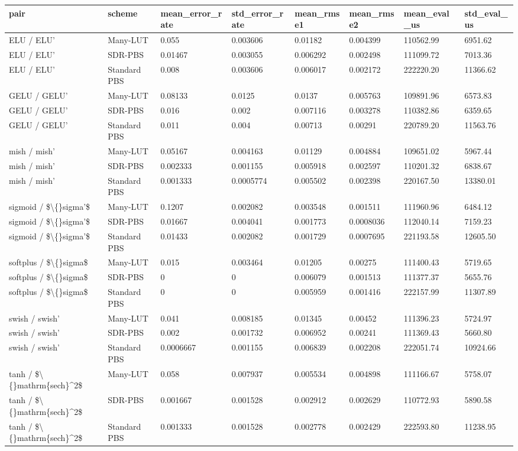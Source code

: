 \small
\setlength{\tabcolsep}{4pt}
\begin{tabular}{llllllll}
\toprule
pair & scheme & mean\_error\_rate & std\_error\_rate & mean\_rmse1 & mean\_rmse2 & mean\_eval\_us & std\_eval\_us \\
\midrule
ELU / ELU' & Many-LUT & 0.055 & 0.003606 & 0.01182 & 0.004399 & 110562.99 & 6951.62 \\
ELU / ELU' & SDR-PBS & 0.01467 & 0.003055 & 0.006292 & 0.002498 & 111099.72 & 7013.36 \\
ELU / ELU' & Standard PBS & 0.008 & 0.003606 & 0.006017 & 0.002172 & 222220.20 & 11366.62 \\
GELU / GELU' & Many-LUT & 0.08133 & 0.0125 & 0.0137 & 0.005763 & 109891.96 & 6573.83 \\
GELU / GELU' & SDR-PBS & 0.016 & 0.002 & 0.007116 & 0.003278 & 110382.86 & 6359.65 \\
GELU / GELU' & Standard PBS & 0.011 & 0.004 & 0.00713 & 0.00291 & 220789.20 & 11563.76 \\
mish / mish' & Many-LUT & 0.05167 & 0.004163 & 0.01129 & 0.004884 & 109651.02 & 5967.44 \\
mish / mish' & SDR-PBS & 0.002333 & 0.001155 & 0.005918 & 0.002597 & 110201.32 & 6838.67 \\
mish / mish' & Standard PBS & 0.001333 & 0.0005774 & 0.005502 & 0.002398 & 220167.50 & 13380.01 \\
sigmoid / \$\textbackslash\{\}sigma'\$ & Many-LUT & 0.1207 & 0.002082 & 0.003548 & 0.001511 & 111960.96 & 6484.12 \\
sigmoid / \$\textbackslash\{\}sigma'\$ & SDR-PBS & 0.01667 & 0.004041 & 0.001773 & 0.0008036 & 112040.14 & 7159.23 \\
sigmoid / \$\textbackslash\{\}sigma'\$ & Standard PBS & 0.01433 & 0.002082 & 0.001729 & 0.0007695 & 221193.58 & 12605.50 \\
softplus / \$\textbackslash\{\}sigma\$ & Many-LUT & 0.015 & 0.003464 & 0.01205 & 0.00275 & 111400.43 & 5719.65 \\
softplus / \$\textbackslash\{\}sigma\$ & SDR-PBS & 0 & 0 & 0.006079 & 0.001513 & 111377.37 & 5655.76 \\
softplus / \$\textbackslash\{\}sigma\$ & Standard PBS & 0 & 0 & 0.005959 & 0.001416 & 222157.99 & 11307.89 \\
swish / swish' & Many-LUT & 0.041 & 0.008185 & 0.01345 & 0.00452 & 111396.23 & 5724.97 \\
swish / swish' & SDR-PBS & 0.002 & 0.001732 & 0.006952 & 0.00241 & 111369.43 & 5660.80 \\
swish / swish' & Standard PBS & 0.0006667 & 0.001155 & 0.006839 & 0.002208 & 222051.74 & 10924.66 \\
tanh / \$\textbackslash\{\}mathrm\{sech\}^2\$ & Many-LUT & 0.058 & 0.007937 & 0.005534 & 0.004898 & 111166.67 & 5758.07 \\
tanh / \$\textbackslash\{\}mathrm\{sech\}^2\$ & SDR-PBS & 0.001667 & 0.001528 & 0.002912 & 0.002629 & 110772.93 & 5890.58 \\
tanh / \$\textbackslash\{\}mathrm\{sech\}^2\$ & Standard PBS & 0.001333 & 0.001528 & 0.002778 & 0.002429 & 222593.80 & 11238.95 \\
\bottomrule
\end{tabular}
